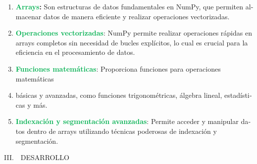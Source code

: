 \documentclass[letterpaper]{article}
\newcommand\textstyleStrong[1]{\textbf{#1}}
\begin{document}
\begin{multicols}{2}
\begin{enumerate}[series=listWWNumvi,label=\Roman*.,ref=\Roman*]
\item {
\foreignlanguage{spanish}{\textbf{\textcolor[HTML]{00B050}{Arrays}}}\foreignlanguage{spanish}{\textbf{:
}}\foreignlanguage{spanish}{Son estructuras de datos fundamentales en NumPy, que permiten almacenar datos de manera
eficiente y realizar operaciones vectorizadas.}}
\item {
\textstyleStrong{\foreignlanguage{spanish}{\textcolor[HTML]{00B050}{Operaciones
vectorizadas}}}\foreignlanguage{spanish}{: NumPy permite realizar operaciones rápidas en arrays completos sin necesidad
de bucles explícitos, lo cual es crucial para la eficiencia en el procesamiento de datos.}}
\item {
\textstyleStrong{\foreignlanguage{spanish}{\textcolor[HTML]{00B050}{Funciones matemáticas}}}\foreignlanguage{spanish}{:
Proporciona funciones para operaciones matemáticas }}
\item {
\foreignlanguage{spanish}{básicas y avanzadas, como funciones trigonométricas, álgebra lineal, estadísticas y más.}}
\item {
\textstyleStrong{\foreignlanguage{spanish}{\textcolor[HTML]{00B050}{Indexación y segmentación
avanzadas}}}\foreignlanguage{spanish}{: Permite acceder y manipular datos dentro de arrays utilizando técnicas
poderosas de indexación y segmentación.}}
\end{enumerate}

\bigskip


\bigskip


\bigskip


\bigskip


\bigskip


\bigskip


\bigskip


\bigskip


\bigskip


\bigskip


\bigskip


\bigskip


\bigskip


\bigskip


\bigskip


\bigskip


\bigskip

{
III.\ \ DESARROLLO}


\end{multicols}
\end{document}
